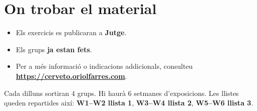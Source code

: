 \documentclass[12pt,a4paper]{report}
\begin{document}
\chapter{On trobar el material}

\begin{itemize}
  \item Els exercicis es publicaran a \textbf{Jutge}.
  \item Els grups \textbf{ja estan fets}.
  \item Per a més informació o indicacions addicionals, consulteu
  \textbf{\url{https://cerveto.oriolfarres.com}}.
\end{itemize}

\begin{tcolorbox}[colback=softblue,colframe=upcblue,title=Resum final]
Cada dilluns sortiran 4 grups. Hi haurà 6 setmanes d'exposicions. Les llistes
queden repartides així: \textbf{W1--W2 llista 1}, \textbf{W3--W4 llista 2},
\textbf{W5--W6 llista 3}.
\end{tcolorbox}
\end{document}
